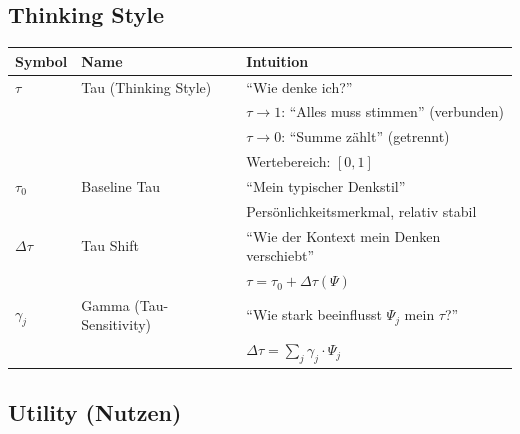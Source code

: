 \subsection{Thinking Style}

\begin{longtable}{p{2cm}p{4cm}p{7cm}}
\toprule
\textbf{Symbol} & \textbf{Name} & \textbf{Intuition} \\
\midrule
\endhead

$\tau$ & Tau (Thinking Style) & 
``Wie denke ich?'' \\
& & $\tau \to 1$: ``Alles muss stimmen'' (verbunden) \\
& & $\tau \to 0$: ``Summe zählt'' (getrennt) \\
& & Wertebereich: $[0, 1]$ \\[6pt]

$\tau_0$ & Baseline Tau & 
``Mein typischer Denkstil'' \\
& & Persönlichkeitsmerkmal, relativ stabil \\[6pt]

$\Delta\tau$ & Tau Shift & 
``Wie der Kontext mein Denken verschiebt'' \\
& & $\tau = \tau_0 + \Delta\tau(\Psi)$ \\[6pt]

$\gamma_j$ & Gamma (Tau-Sensitivity) & 
``Wie stark beeinflusst $\Psi_j$ mein $\tau$?'' \\
& & $\Delta\tau = \sum_j \gamma_j \cdot \Psi_j$ \\[6pt]

\bottomrule
\end{longtable}

\subsection{Utility (Nutzen)}

